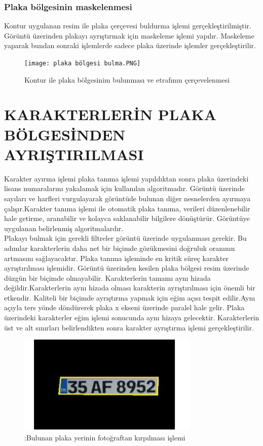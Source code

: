 \subsubsection{Plaka bölgesinin maskelenmesi}
\cite{plate}
Kontur uygulanan resim ile plaka çerçevesi buldurma işlemi gerçekleştirilmiştir. Görüntü üzerinden plakayı ayrıştırmak için maskeleme işlemi yapılır. Maskeleme yaparak bundan sonraki işlemlerde sadece plaka üzerinde işlemler gerçekleştirilir. 
\begin{figure}
    \centering
    \texttt{[image: plaka bölgesi bulma.PNG]}
    \caption{Kontur ile plaka bölgesinim bulunması ve etrafının
çerçevelenmesi}
    \label{fig:my_label}
\end{figure}
\section{KARAKTERLERİN PLAKA BÖLGESİNDEN AYRIŞTIRILMASI}
Karakter ayırma işlemi plaka tanıma işlemi yapıldıktan sonra plaka üzerindeki lisans numaralarını yakalamak için kullanılan algoritmadır. Görüntü üzerinde sayıları ve harfleri vurgulayarak görüntüde bulunan diğer nesnelerden ayırmaya çalışır.Karakter tanıma işlemi ile otomatik plaka tanıma, verileri düzenlenebilir hale getirme, aranabilir ve kolayca saklanabilir bilgilere dönüştürür. Görüntüye uygulanan belirlenmiş algoritmalardır. 
\\
\cite{complex}
Plakayı bulmak için gerekli filtreler görüntü üzerinde uygulanması gerekir. Bu adımlar karakterlerin daha net bir biçimde gözükmesini doğruluk oranının artmasını sağlayacaktır. Plaka tanıma işleminde en kritik süreç karakter ayrıştırılması işlemidir. Görüntü üzerinden kesilen plaka bölgesi resim üzerinde düzgün bir biçimde olmayabilir. Karakterlerin tamamı aynı hizada değildir.Karakterlerin aynı hizada olması karakterin ayrıştırılması için önemli bir etkendir. Kaliteli bir biçimde ayrıştırma yapmak için eğim açısı tespit edilir.Aynı açıyla ters yönde döndürerek plaka x ekseni üzerinde paralel hale gelir. Plaka üzerindeki karakterler eğim işlemi sonucunda aynı hizaya gelecektir. Karakterlerin üst ve alt sınırları belirlendikten sonra karakter ayrıştırma işlemi gerçekleştirilir.
\begin{figure}
    \centering
    \includegraphics{kırpma.PNG}
    \caption{:Bulunan plaka yerinin fotoğraftan kırpılması işlemi}
    \label{fig:my_label}
\end{figure}
